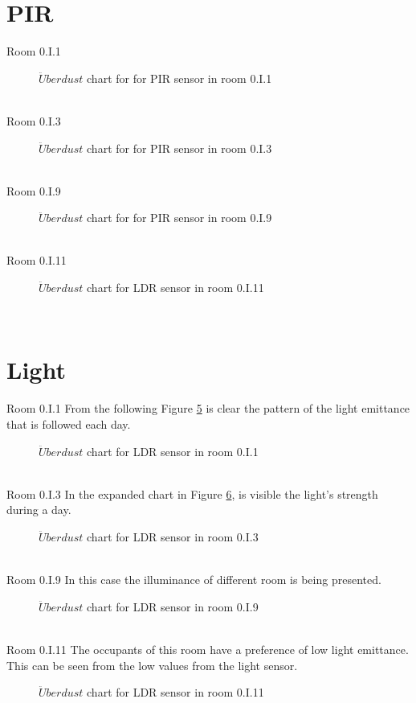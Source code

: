 \documentclass[12pt,a4paper]{report}
\begin{document}
\section{PIR}
%
{Room 0.I.1}
%
\ \\
\begin{figure}[H]
\centering
\caption{$\ddot{U}berdust$ chart for for PIR sensor in room 0.I.1}
\label{chart_pir_1}
\end{figure}
\ \\
%
{Room 0.I.3}
%
\begin{figure}[H]
\centering
\caption{$\ddot{U}berdust$ chart for for PIR sensor in room 0.I.3}
\label{chart_pir_3}
\end{figure}
\ \\
%
{Room 0.I.9}
%
\begin{figure}[H]
\centering
\caption{$\ddot{U}berdust$ chart for for PIR sensor in room 0.I.9}
\label{chart_pir_9}
\end{figure}
\ \\
%
{Room 0.I.11}
%
\begin{figure}[H]
\centering
\caption{$\ddot{U}berdust$ chart for LDR sensor in room 0.I.11}
\label{chart_light_1}
\end{figure}
\ \\
%
\section{Light}
%
{Room 0.I.1}
%
From the following Figure \ref{chart_light_1} is clear the pattern of the light emittance that is followed each day.
\begin{figure}[H]
\centering
\caption{$\ddot{U}berdust$ chart for LDR sensor in room 0.I.1}
\label{chart_light_1}
\end{figure}
\ \\
%
{Room 0.I.3}
%
In the expanded chart in Figure \ref{chart_light_3}, is visible the light's strength during a day.
\begin{figure}[H]
\centering
\caption{$\ddot{U}berdust$ chart for LDR sensor in room 0.I.3}
\label{chart_light_3}
\end{figure}
\ \\
%
{Room 0.I.9}
%
In this case the illuminance of different room is being presented.
\begin{figure}[H]
\centering
\caption{$\ddot{U}berdust$ chart for LDR sensor in room 0.I.9}
\label{chart_light_9}
\end{figure}
\ \\
%
{Room 0.I.11}
%
The occupants of this room have a preference of low light emittance. This can be seen from the low values from the light sensor.
\begin{figure}[H]
\centering
\caption{$\ddot{U}berdust$ chart for LDR sensor in room 0.I.11}
\label{chart_light_11}
\end{figure}
\ \\
%
\end{document}
